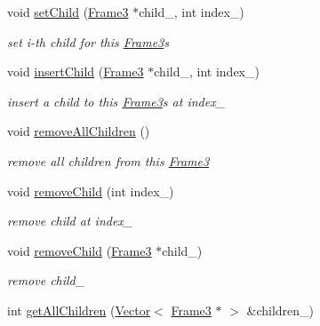 \begin{DoxyCompactItemize}
void \hyperlink{class_magnum_1_1_frame3_a64ca03a7b807989e1cbd50f66060df4d}{set\+Child} (\hyperlink{class_magnum_1_1_frame3}{Frame3} $\ast$child\+\_\+, int index\+\_\+)
\begin{DoxyCompactList}\small\item\em set i-\/th child for this \hyperlink{class_magnum_1_1_frame3}{Frame3}\textquotesingle{}s \end{DoxyCompactList}\item 
void \hyperlink{class_magnum_1_1_frame3_abd28ece5e1c768a39c5786b233577a51}{insert\+Child} (\hyperlink{class_magnum_1_1_frame3}{Frame3} $\ast$child\+\_\+, int index\+\_\+)
\begin{DoxyCompactList}\small\item\em insert a child to this \hyperlink{class_magnum_1_1_frame3}{Frame3}\textquotesingle{}s at index\+\_\+ \end{DoxyCompactList}\item 
void \hyperlink{class_magnum_1_1_frame3_ac0b78ba19552fe28163db05161795a37}{remove\+All\+Children} ()\hypertarget{class_magnum_1_1_frame3_ac0b78ba19552fe28163db05161795a37}{}\label{class_magnum_1_1_frame3_ac0b78ba19552fe28163db05161795a37}

\begin{DoxyCompactList}\small\item\em remove all children from this \hyperlink{class_magnum_1_1_frame3}{Frame3} \end{DoxyCompactList}\item 
void \hyperlink{class_magnum_1_1_frame3_a9bba1efc2cdadd1d11c1fdd3ac6e43bd}{remove\+Child} (int index\+\_\+)\hypertarget{class_magnum_1_1_frame3_a9bba1efc2cdadd1d11c1fdd3ac6e43bd}{}\label{class_magnum_1_1_frame3_a9bba1efc2cdadd1d11c1fdd3ac6e43bd}

\begin{DoxyCompactList}\small\item\em remove child at index\+\_\+ \end{DoxyCompactList}\item 
void \hyperlink{class_magnum_1_1_frame3_a7f5e45ec9722716b94932e3b9ba1b019}{remove\+Child} (\hyperlink{class_magnum_1_1_frame3}{Frame3} $\ast$child\+\_\+)\hypertarget{class_magnum_1_1_frame3_a7f5e45ec9722716b94932e3b9ba1b019}{}\label{class_magnum_1_1_frame3_a7f5e45ec9722716b94932e3b9ba1b019}

\begin{DoxyCompactList}\small\item\em remove child\+\_\+ \end{DoxyCompactList}\item 
int \hyperlink{class_magnum_1_1_frame3_a337b8663b91864fc671a2ffadb6ffad1}{get\+All\+Children} (\hyperlink{class_magnum_1_1_vector}{Vector}$<$ \hyperlink{class_magnum_1_1_frame3}{Frame3} $\ast$ $>$ \&children\+\_\+)\hypertarget{class_magnum_1_1_frame3_a337b8663b91864fc671a2ffadb6ffad1}{}\label{class_magnum_1_1_frame3_a337b8663b91864fc671a2ffadb6ffad1}


\end{DoxyCompactItemize}
